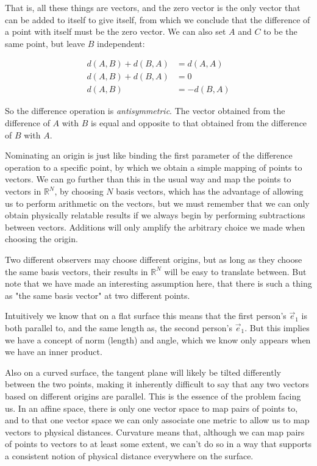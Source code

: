 That is, all these things are vectors, and the zero vector is the only vector that can be added to itself to give itself, from which we conclude that the difference of a point with itself must be the zero vector. We can also set $A$ and $C$ to be the same point, but leave $B$ independent:

\begin{equation}
    \begin{split}
    d(A, B) + d(B, A) &= d(A, A) \\
    d(A, B) + d(B, A) &= 0 \\
    d(A, B) &= -d(B, A)
    \end{split}
\end{equation}

So the difference operation is \textit{antisymmetric}. The vector obtained from the difference of $A$ with $B$ is equal and opposite to that obtained from the difference of $B$ with $A$.

Nominating an origin is just like binding the first parameter of the difference operation to a specific point, by which we obtain a simple mapping of points to vectors. We can go further than this in the usual way and map the points to vectors in $\mathbb{R}^N$, by choosing $N$ basis vectors, which has the advantage of allowing us to perform arithmetic on the vectors, but we must remember that we can only obtain physically relatable results if we always begin by performing subtractions between vectors. Additions will only amplify the arbitrary choice we made when choosing the origin.

Two different observers may choose different origins, but as long as they choose the same basis vectors, their results in $\mathbb{R}^N$ will be easy to translate between. But note that we have made an interesting assumption here, that there is such a thing as "the same basis vector" at two different points.

Intuitively we know that on a flat surface this means that the first person's $\vec{e}_1$ is both parallel to, and the same length as, the second person's $\vec{e}_1$. But this implies we have a concept of norm (length) and angle, which we know only appears when we have an inner product.

Also on a curved surface, the tangent plane will likely be tilted differently between the two points, making it inherently difficult to say that any two vectors based on different origins are parallel. This is the essence of the problem facing us. In an affine space, there is only one vector space to map pairs of points to, and to that one vector space we can only associate one metric to allow us to map vectors to physical distances. Curvature means that, although we can map pairs of points to vectors to at least some extent, we can't do so in a way that supports a consistent notion of physical distance everywhere on the surface.


